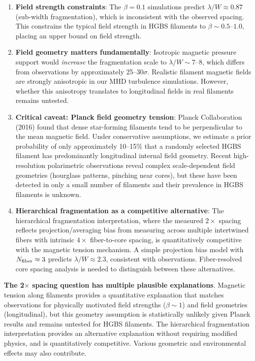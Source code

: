 \documentclass[11pt,a4paper]{article}
\begin{document}
\begin{enumerate}
    \item \textbf{Field strength constraints}: The $\beta = 0.1$ simulations predict $\lambda/W \approx 0.87$ (sub-width fragmentation), which is inconsistent with the observed spacing. This constrains the typical field strength in HGBS filaments to $\beta \sim 0.5$--$1.0$, placing an upper bound on field strength.

    \item \textbf{Field geometry matters fundamentally}: Isotropic magnetic pressure support would \textit{increase} the fragmentation scale to $\lambda/W \sim 7$--$8$, which differs from observations by approximately 25--$30\sigma$. Realistic filament magnetic fields are strongly anisotropic in our MHD turbulence simulations. However, whether this anisotropy translates to longitudinal fields in real filaments remains untested.

    \item \textbf{Critical caveat: Planck field geometry tension}: Planck Collaboration (2016) found that dense star-forming filaments tend to be perpendicular to the mean magnetic field. Under conservative assumptions, we estimate a prior probability of only approximately 10--15\% that a randomly selected HGBS filament has predominantly longitudinal internal field geometry. Recent high-resolution polarimetric observations reveal complex scale-dependent field geometries (hourglass patterns, pinching near cores), but these have been detected in only a small number of filaments and their prevalence in HGBS filaments is unknown.

    \item \textbf{Hierarchical fragmentation as a competitive alternative}: The hierarchical fragmentation interpretation, where the measured $2\times$ spacing reflects projection/averaging bias from measuring across multiple intertwined fibers with intrinsic $4\times$ fiber-to-core spacing, is quantitatively competitive with the magnetic tension mechanism. A simple projection bias model with $N_{\rm fiber} \approx 3$ predicts $\lambda/W \approx 2.3$, consistent with observations. Fiber-resolved core spacing analysis is needed to distinguish between these alternatives.
\end{enumerate}

\textbf{The 2$\times$ spacing question has multiple plausible explanations}. Magnetic tension along filaments provides a quantitative explanation that matches observations for physically motivated field strengths ($\beta \sim 1$) and field geometries (longitudinal), but this geometry assumption is statistically unlikely given Planck results and remains untested for HGBS filaments. The hierarchical fragmentation interpretation provides an alternative explanation without requiring modified physics, and is quantitatively competitive. Various geometric and environmental effects may also contribute.
\end{document}
